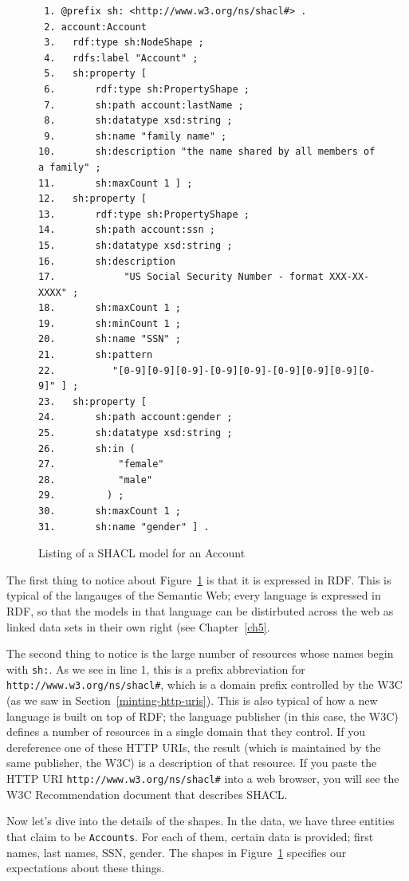 \begin{figure}
  \begin{lstlisting}
 1. @prefix sh: <http://www.w3.org/ns/shacl#> .
 2. account:Account
 3.   rdf:type sh:NodeShape ;
 4.   rdfs:label "Account" ;
 5.   sh:property [
 6.       rdf:type sh:PropertyShape ;
 7.       sh:path account:lastName ;
 8.       sh:datatype xsd:string ;
 9.       sh:name "family name" ;
10.       sh:description "the name shared by all members of a family" ;
11.       sh:maxCount 1 ] ;
12.   sh:property [
13.       rdf:type sh:PropertyShape ;
14.       sh:path account:ssn ;
15.       sh:datatype xsd:string ;
16.       sh:description
17.            "US Social Security Number - format XXX-XX-XXXX" ;
18.       sh:maxCount 1 ;
19.       sh:minCount 1 ;
20.       sh:name "SSN" ;
21.       sh:pattern
22.          "[0-9][0-9][0-9]-[0-9][0-9]-[0-9][0-9][0-9][0-9]" ] ;
23.   sh:property [
24.       sh:path account:gender ;
25.       sh:datatype xsd:string ;
26.       sh:in (
27.           "female"
28.           "male"
29.         ) ;
30.       sh:maxCount 1 ;
31.       sh:name "gender" ] .
  \end{lstlisting}
  \caption{Listing of a SHACL model for an Account}
  \label{fig:ch7.account}
\end{figure}

The first thing to notice about Figure~\ref{fig:ch7.account} is that it is expressed in RDF.  This is typical of the langauges of the Semantic Web; every language is expressed in RDF, so that the models in that language can be distirbuted across the web as linked data sets in their own right (see Chapter~\ref{ch5}. 

The second thing to notice is the large number of resources whose names
begin with \texttt{sh:}.  As we see in line 1, this is a prefix abbreviation for
\texttt{http://www.w3.org/ns/shacl\#}, which is a domain prefix controlled by the
W3C (as we saw in Section~\ref{minting-http-uris}).  This is also typical of how a
new language is built on top of RDF; the language publisher (in this case, the W3C)
defines a number of resources in a single domain that they control.  If you dereference
one of these HTTP URIs, the result (which is maintained by the same publisher, the W3C) is a 
description of that resource.  If you paste the HTTP URI 
\texttt{http://www.w3.org/ns/shacl\#} into a web browser, you will see the W3C 
Recommendation document that describes SHACL.


Now let's dive into the details of the shapes.  
In the data, we have three entities that claim to be \texttt{Accounts}.  For
each of them, certain data is provided; first names, last names, SSN, gender.
The shapes in Figure~\ref{fig:ch7.account} specifies our expectations about these
things.


